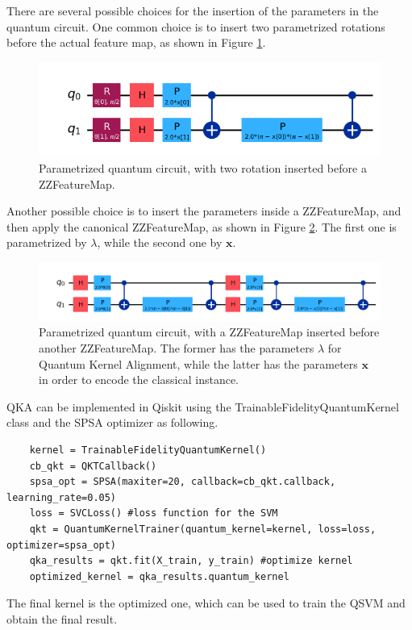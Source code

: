 \documentclass[12pt]{article}
\begin{document}
There are several possible choices for the insertion of the parameters in the quantum circuit. One common choice is to insert two parametrized rotations before the actual feature map, as shown in Figure \ref{fig:param rotation}. 
\begin{figure}[h!]
    \centering
    \includegraphics[width=\textwidth]{images/rotationsbeforeZZ.png}
    \caption{Parametrized quantum circuit, with two rotation inserted before a ZZFeatureMap.}
    \label{fig:param rotation}
\end{figure}
Another possible choice is to insert the parameters inside a ZZFeatureMap, and then apply the canonical ZZFeatureMap, as shown in Figure \ref{fig:ZZafterZZ}. The first one is parametrized by $\lambda$, while the second one by $\mathbf{x}$.
\begin{figure}[h!]
    \centering
    \includegraphics[width=\textwidth]{images/ZZafterZZ.png}
    \caption{Parametrized quantum circuit, with a ZZFeatureMap inserted before another ZZFeatureMap. The former has the parameters $\lambda$ for Quantum Kernel Alignment, while the latter has the parameters $\mathbf{x}$ in order to encode the classical instance.}
    \label{fig:ZZafterZZ}
\end{figure}

QKA can be implemented in Qiskit using the TrainableFidelityQuantumKernel class and the SPSA optimizer as following. 
\begin{lstlisting}
    kernel = TrainableFidelityQuantumKernel()
    cb_qkt = QKTCallback()
    spsa_opt = SPSA(maxiter=20, callback=cb_qkt.callback, learning_rate=0.05)
    loss = SVCLoss() #loss function for the SVM
    qkt = QuantumKernelTrainer(quantum_kernel=kernel, loss=loss, optimizer=spsa_opt)
    qka_results = qkt.fit(X_train, y_train) #optimize kernel
    optimized_kernel = qka_results.quantum_kernel
\end{lstlisting}
The final kernel is the optimized one, which can be used to train the QSVM and obtain the final result. 
\end{document}
